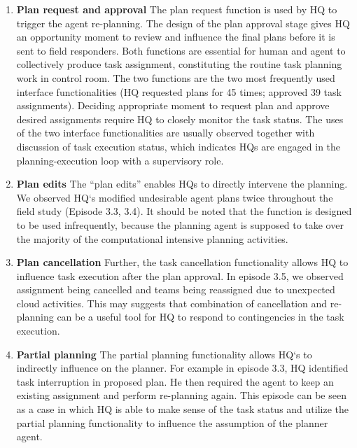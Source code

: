 \begin{enumerate}
\item \textbf{ Plan request and approval } The plan request function is used by HQ to trigger the agent re-planning. The design of the plan approval stage gives HQ an opportunity moment to review and influence the final plans before it is sent to field responders. Both functions are essential for human and agent to collectively produce task assignment, constituting the routine task planning work in control room. The two functions are the two most frequently used interface functionalities (HQ requested plans for 45 times; approved 39 task assignments). Deciding appropriate moment to request plan and approve desired assignments require HQ to closely monitor the task status. The uses of the two interface functionalities are usually observed together with discussion of task execution status, which indicates HQs are engaged in the planning-execution loop with a supervisory role. \\

\item \textbf{ Plan edits } The ``plan edits'' enables HQs to directly intervene the planning. We observed HQ`s modified undesirable agent plans twice throughout the field study (Episode 3.3, 3.4). It should be noted that the function is designed to be used infrequently, because the planning agent is supposed to take over the majority of the computational intensive planning activities. \\

\item \textbf{ Plan cancellation } Further, the task cancellation functionality allows HQ to influence task execution after the plan approval. In episode 3.5, we observed assignment being cancelled and teams being reassigned due to unexpected cloud activities. This may suggests that combination of cancellation and re-planning can be a useful tool for HQ to respond to contingencies in the task execution.\\

\item \textbf{ Partial planning } The partial planning functionality allows HQ`s to indirectly influence on the planner. For example in episode 3.3, HQ identified task interruption in proposed plan. He then required the agent to keep an existing assignment and perform re-planning again.  This episode can be seen as a case in which HQ is able to make sense of the task status and utilize the partial planning functionality to influence the assumption of the planner agent. \\

\end{enumerate}

